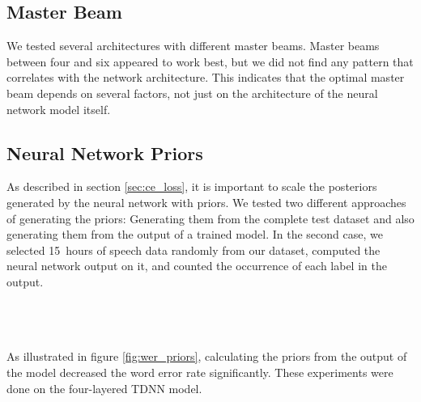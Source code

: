 \subsection{Master Beam}
We tested several architectures with different master beams. Master beams between four and six appeared to work best, but we did not find any pattern that correlates with the network architecture. This indicates that the optimal master beam depends on several factors, not just on the architecture of the neural network model itself. 
\subsection{Neural Network Priors}
\label{sec:tdnn_prior}
As described in section \ref{sec:ce_loss}, it is important to scale the posteriors generated by the neural network with priors. We tested two different approaches of generating the priors: Generating them from the complete test dataset and also generating them from the output of a trained model. In the second case, we selected 15~hours of speech data randomly from our dataset, computed the neural network output on it, and counted the occurrence of each label in the output. \\ \\
\begin{minipage}{\linewidth}
	\centering
	\label{fig:wer_priors}
\end{minipage} 
\\ \\
As illustrated in figure \ref{fig:wer_priors}, calculating the priors from the output of the model decreased the word error rate significantly. These experiments were done on the four-layered TDNN model. 
